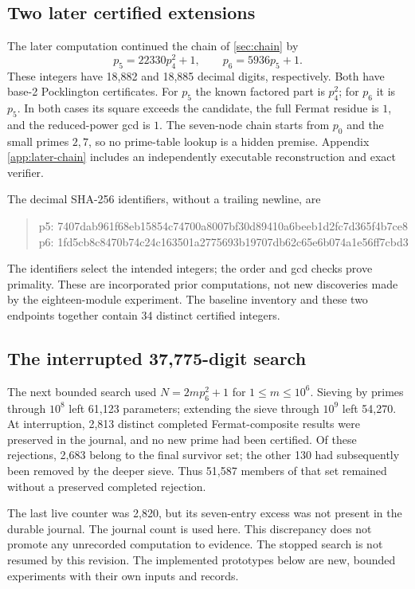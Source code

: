 \documentclass[11pt,a4paper]{article}
\theoremstyle{definition}\newtheorem{definition}[theorem]{Definition}
\theoremstyle{remark}\newtheorem{remark}[theorem]{Remark}
\begin{document}
\subsection{Two later certified extensions}

The later computation continued the chain of \cref{sec:chain} by
\[
 p_5=22330p_4^2+1,\qquad p_6=5936p_5+1.
\]
These integers have 18,882 and 18,885 decimal digits, respectively. Both
have base-2 Pocklington certificates. For $p_5$ the known factored part is
$p_4^2$; for $p_6$ it is $p_5$. In both cases its square exceeds the
candidate, the full Fermat residue is $1$, and the reduced-power gcd is
$1$. The seven-node chain starts from $p_0$ and the small primes $2,7$,
so no prime-table lookup is a hidden premise. Appendix
\ref{app:later-chain} includes an independently executable reconstruction
and exact verifier.

The decimal SHA-256 identifiers, without a trailing newline, are
\begin{quote}\small\ttfamily
p5: 7407dab961f68eb15854c74700a8007bf30d89410a6beeb1d2fc7d365f4b7ce8\\
p6: 1fd5cb8c8470b74c24c163501a2775693b19707db62c65e6b074a1e56ff7cbd3
\end{quote}
The identifiers select the intended integers; the order and gcd checks
prove primality. These are incorporated prior computations, not new
discoveries made by the eighteen-module experiment. The baseline inventory
and these two endpoints together contain 34 distinct certified integers.

\subsection{The interrupted 37,775-digit search}

The next bounded search used $N=2mp_6^2+1$ for
$1\le m\le10^6$. Sieving by primes through $10^8$ left 61,123 parameters;
extending the sieve through $10^9$ left 54,270. At interruption,
2,813 distinct completed Fermat-composite results were preserved in the
journal, and no new prime had been certified. Of these rejections, 2,683
belong to the final survivor set; the other 130 had subsequently been
removed by the deeper sieve. Thus 51,587 members of that set remained
without a preserved completed rejection.

The last live counter was 2,820, but its seven-entry excess was not present
in the durable journal. The journal count is used here. This discrepancy
does not promote any unrecorded computation to evidence. The stopped search
is not resumed by this revision. The implemented prototypes below are new,
bounded experiments with their own inputs and records.
\end{document}
